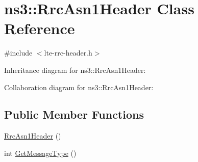 \hypertarget{classns3_1_1RrcAsn1Header}{}\section{ns3\+:\+:Rrc\+Asn1\+Header Class Reference}
\label{classns3_1_1RrcAsn1Header}


{\ttfamily \#include $<$lte-\/rrc-\/header.\+h$>$}



Inheritance diagram for ns3\+:\+:Rrc\+Asn1\+Header\+:


Collaboration diagram for ns3\+:\+:Rrc\+Asn1\+Header\+:
\subsection*{Public Member Functions}
\begin{DoxyCompactItemize}
\item 
\hyperlink{classns3_1_1RrcAsn1Header_a019e9b370686914ec8a110209c6d589d}{Rrc\+Asn1\+Header} ()
\item 
int \hyperlink{classns3_1_1RrcAsn1Header_ad7abf4d70e7d8e9412a224ea7c50ef57}{Get\+Message\+Type} ()
\end{DoxyCompactItemize}
